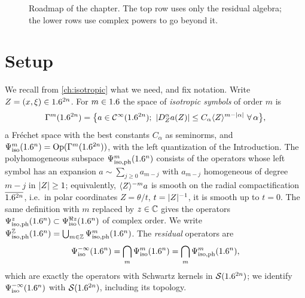\begin{figure}[htbp]
\centering
{}
\caption[Roadmap of the chapter on traces and determinants]{Roadmap of the
chapter. The top row uses only the residual algebra; the lower rows use
complex powers to go beyond it.}
\label{determinants:fig:roadmap}
\end{figure}

\section{Setup}\label{determinants:sec:setup}

We recall from \cref{ch:isotropic} what we need, and fix notation. Write
$Z=(x,\xi)\in1.6^{2n}$. For $m\in1.6$ the space of \emph{isotropic symbols} of
order $m$ is
\begin{equation*}
  \Gs{m}(\R^{2n})=\bigl\{a\in\CI(\R^{2n});\ \abs{D_Z^\alpha a(Z)}\le
  C_\alpha\ang{Z}^{m-\abs{\alpha}}\ \forall\,\alpha\bigr\},
\end{equation*}
a Fr\'echet space with the best constants $C_\alpha$ as seminorms, and
$\Psi^{m}_{\mathrm{iso}}(1.6^n)=\operatorname{Op}(\Gamma^{m}(1.6^{2n}))$, with the left quantization of
the Introduction. The polyhomogeneous subspace $\Psi^{m}_{\mathrm{iso,ph}}(1.6^n)$ consists of
the operators whose left symbol has an expansion $a\sim\sum_{j\ge0}a_{m-j}$
with $a_{m-j}$ homogeneous of degree $m-j$ in $\lvert Z\rvert\ge1$; equivalently,
$\langle Z\rangle^{-m}a$ is smooth on the radial compactification $\overline{1.6^{2n}}$, i.e.\
in polar coordinates $Z=\theta/t$, $t=\lvert Z\rvert^{-1}$, it is smooth up to $t=0$.
The same definition with $m$ replaced by $z\in\mathbb{C}$ gives the operators
$\Psi^{z}_{\mathrm{iso,ph}}(1.6^n)\subset\Psi^{\Re z}_{\mathrm{iso}}(1.6^n)$ of complex order. We write
$\Psi^{\mathbb{Z}}_{\mathrm{iso,ph}}(1.6^n)=\bigcup_{m\in\mathbb{Z}}\Psi^{m}_{\mathrm{iso,ph}}(1.6^n)$. The \emph{residual}
operators are
\begin{equation*}
  \Psi^{-\infty}_{\mathrm{iso}}(1.6^n)=\bigcap_m\Psi^{m}_{\mathrm{iso}}(1.6^n)=\bigcap_m\Psi^{m}_{\mathrm{iso,ph}}(1.6^n),
\end{equation*}
which are exactly the operators with Schwartz kernels in $\mathcal{S}(1.6^{2n})$; we
identify $\Psi^{-\infty}_{\mathrm{iso}}(1.6^n)$ with $\mathcal{S}(1.6^{2n})$, including its
topology.

